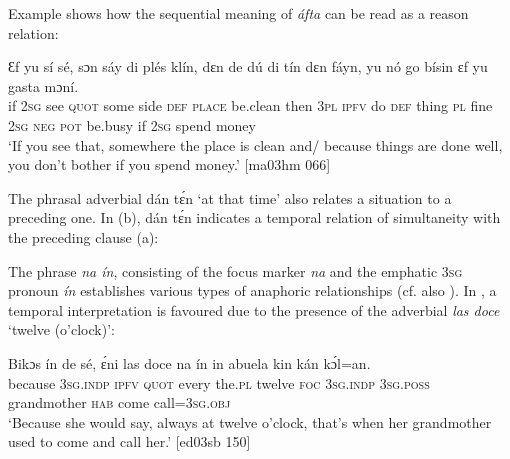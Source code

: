 Example  shows how the sequential meaning of \textit{áfta} can be read as a reason relation: 


\ea%
    \label{ex:key:1358}
    \gll Ɛf  yu  sí  sé,    sɔn    sáy  di  plés    klín,        dɛn  de  dú  
di  tín    dɛn  fáyn,  yu  nó  go  bísin  ɛf  yu  gasta  mɔní.\\
if  \textsc{2sg}  see  \textsc{quot}    some  side  \textsc{def}  \textsc{place}  be.clean  then  \textsc{3pl}  \textsc{ipfv}  do  
\textsc{def}  thing  \textsc{pl}  fine    \textsc{2sg}  \textsc{neg}  \textsc{pot}  be.busy  if  \textsc{2sg}  spend  money\\

\glt ‘If you see that, somewhere the place is clean and/ because things are done well, 
you don’t bother if you spend money.’ [ma03hm 066]
\z

The phrasal adverbial dán tɛ́n ‘at that time’ also relates a situation to a preceding one. In (b), dán tɛ́n indicates a temporal relation of simultaneity with the preceding clause (a):


\ea%
    \label{ex:key:1359}
\z\z

The phrase \textit{na ín}, consisting of the focus marker \textit{na} and the emphatic \textsc{3sg} pronoun \textit{ín} establishes various types of anaphoric relationships (cf. also ). In , a temporal interpretation is favoured due to the presence of the adverbial \textit{las doce} ‘twelve (o’clock)’:


\ea%
    \label{ex:key:1360}
    \gll Bikɔs  ín    de  sé,    ɛ́ni    las    doce  na  ín    in
abuela    kin  kán    kɔ́l=an.\\
because  \textsc{3sg.indp}  \textsc{ipfv}  \textsc{quot}    every  the.\textsc{pl}  twelve  \textsc{foc}  \textsc{3sg.indp}  \textsc{3sg.poss}
grandmother  \textsc{hab}  come  call=\textsc{3sg.obj}\\

\glt ‘Because she would say, always at twelve o’clock, that’s when her 
grandmother used to come and call her.’ [ed03sb 150]
\z

